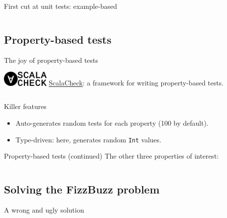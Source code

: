\begin{frame}[fragile]{First cut at unit tests: example-based}
  \inputminted{scala}{FizzBuzzSpec1.scala}
\end{frame}

\subsection{Property-based tests}

\begin{frame}[fragile]{The joy of property-based tests}
    \begin{block}{\includegraphics[height=0.75cm]{logo_forall_h61.png}\includegraphics[height=0.75cm]{logo_scalacheck_h61.png}}
      \href{http://scalacheck.org/}{ScalaCheck}: a framework for writing \alert{property-based} tests.
  \end{block}

  \inputminted{scala}{FizzBuzzSpec2.scala}

  \begin{block}{Killer features}
    \begin{itemize}
    \item Auto-generates random tests for each property (100 by default).
    \item \alert{Type-driven}: here, generates random \texttt{Int} values.
    \end{itemize}
  \end{block}
\end{frame}

\begin{frame}[fragile]{Property-based tests (continued)}
  The other three properties of interest:

  \inputminted{scala}{FizzBuzzSpec3.scala}
\end{frame}

\subsection{Solving the FizzBuzz problem}

\begin{frame}[fragile]{A wrong and ugly solution}
  \inputminted[gobble=2]{scala}{FizzBuzzIf.scala}

  \inputminted{console}{testQuick3.console}
\end{frame}

